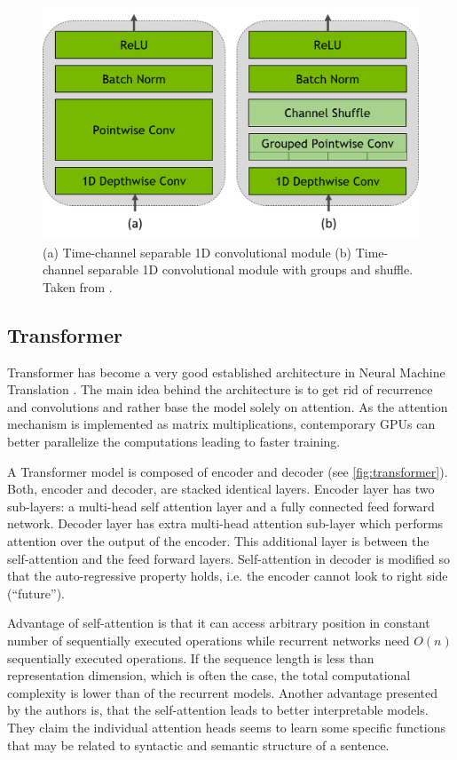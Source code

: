 \begin{figure}[h]
 \centering
 \includegraphics[width=\linewidth]{img/QuartzNet_Grouped_v2.png}
 \caption{(a) Time-channel separable 1D convolutional module (b) Time-channel separable 1D convolutional module with groups and shuffle. Taken from .}
 \label{fig:quartz_arch_groups}
\end{figure}


\subsection{Transformer}
Transformer  has become a very good established architecture in Neural Machine Translation . The main idea behind the architecture is to get rid of recurrence and convolutions and rather base the model solely on attention. As the attention mechanism is implemented as matrix multiplications, contemporary GPUs can better parallelize the computations leading to faster training.

A Transformer model is composed of encoder and decoder (see \cref{fig:transformer}). Both, encoder and decoder, are stacked identical layers. Encoder layer has two sub-layers: a multi-head self attention layer and a fully connected feed forward network. Decoder layer has extra multi-head attention sub-layer which performs attention over the output of the encoder. This additional layer is between the self-attention and the feed forward layers. Self-attention in decoder is modified so that the auto-regressive property holds, i.e. the encoder cannot look to right side (``future'').

Advantage of self-attention is that it can access arbitrary position in constant number of sequentially executed operations while recurrent networks need $O(n)$ sequentially executed operations. If the sequence length is less than representation dimension, which is often the case, the total computational complexity is lower than of the recurrent models. Another advantage presented by the authors is, that the self-attention leads to better interpretable models. They claim the individual attention heads seems to learn some specific functions that may be related to syntactic and semantic structure of a sentence.


